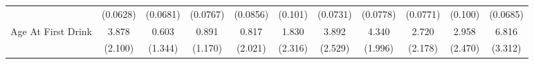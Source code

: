 {\begin{tabular}{l*{10}{c}}
            &    (0.0628)         &    (0.0681)         &    (0.0767)         &    (0.0856)         &     (0.101)         &    (0.0731)         &    (0.0778)         &    (0.0771)         &     (0.100)         &    (0.0685)         \\
\addlinespace
Age At First Drink&       3.878         &       0.603         &       0.891         &       0.817         &       1.830         &       3.892         &       4.340\sym{*}  &       2.720         &       2.958         &       6.816\sym{*}  \\
            &     (2.100)         &     (1.344)         &     (1.170)         &     (2.021)         &     (2.316)         &     (2.529)         &     (1.996)         &     (2.178)         &     (2.470)         &     (3.312)         \\
\bottomrule
\end{tabular}
}
